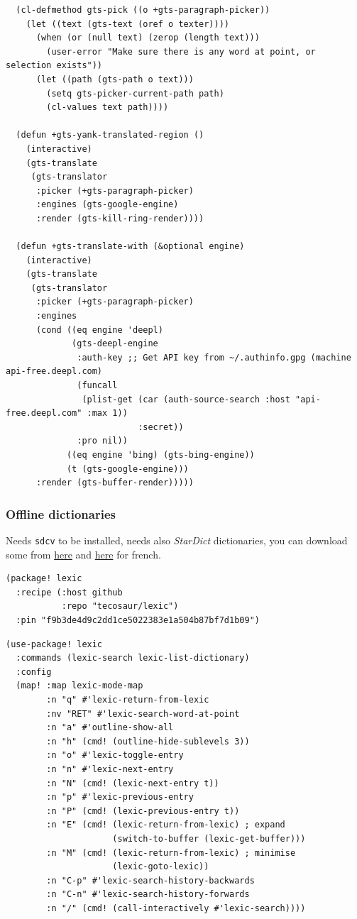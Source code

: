 \documentclass[11pt]{article}
\begin{document}
\begin{verbatim}
  (cl-defmethod gts-pick ((o +gts-paragraph-picker))
    (let ((text (gts-text (oref o texter))))
      (when (or (null text) (zerop (length text)))
        (user-error "Make sure there is any word at point, or selection exists"))
      (let ((path (gts-path o text)))
        (setq gts-picker-current-path path)
        (cl-values text path))))

  (defun +gts-yank-translated-region ()
    (interactive)
    (gts-translate
     (gts-translator
      :picker (+gts-paragraph-picker)
      :engines (gts-google-engine)
      :render (gts-kill-ring-render))))

  (defun +gts-translate-with (&optional engine)
    (interactive)
    (gts-translate
     (gts-translator
      :picker (+gts-paragraph-picker)
      :engines
      (cond ((eq engine 'deepl)
             (gts-deepl-engine
              :auth-key ;; Get API key from ~/.authinfo.gpg (machine api-free.deepl.com)
              (funcall
               (plist-get (car (auth-source-search :host "api-free.deepl.com" :max 1))
                          :secret))
              :pro nil))
            ((eq engine 'bing) (gts-bing-engine))
            (t (gts-google-engine)))
      :render (gts-buffer-render)))))
\end{verbatim}

\subsubsection{Offline dictionaries}
\label{sec:org02c4176}
Needs \texttt{sdcv} to be installed, needs also \emph{StarDict} dictionaries, you can download
some from \href{https://sites.google.com/site/gtonguedict/home/stardict-dictionaries}{here} and \href{https://polyglotte.tuxfamily.org/doku.php?id=donnees:dicos\_bilingues}{here} for french.

\begin{verbatim}
(package! lexic
  :recipe (:host github
           :repo "tecosaur/lexic")
  :pin "f9b3de4d9c2dd1ce5022383e1a504b87bf7d1b09")
\end{verbatim}

\begin{verbatim}
(use-package! lexic
  :commands (lexic-search lexic-list-dictionary)
  :config
  (map! :map lexic-mode-map
        :n "q" #'lexic-return-from-lexic
        :nv "RET" #'lexic-search-word-at-point
        :n "a" #'outline-show-all
        :n "h" (cmd! (outline-hide-sublevels 3))
        :n "o" #'lexic-toggle-entry
        :n "n" #'lexic-next-entry
        :n "N" (cmd! (lexic-next-entry t))
        :n "p" #'lexic-previous-entry
        :n "P" (cmd! (lexic-previous-entry t))
        :n "E" (cmd! (lexic-return-from-lexic) ; expand
                     (switch-to-buffer (lexic-get-buffer)))
        :n "M" (cmd! (lexic-return-from-lexic) ; minimise
                     (lexic-goto-lexic))
        :n "C-p" #'lexic-search-history-backwards
        :n "C-n" #'lexic-search-history-forwards
        :n "/" (cmd! (call-interactively #'lexic-search))))
\end{verbatim}
\end{document}
